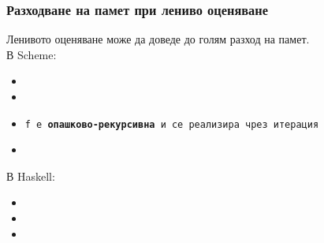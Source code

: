 \documentclass{beamer}
\begin{document}
\begin{frame}
  \frametitle{Разходване на памет при лениво оценяване}

  Ленивото оценяване може да доведе до голям разход на памет.\\[1em]\pause
  В Scheme:
  \lstset{language=Scheme}
  \begin{itemize}[<+->]
  \item {}
  \item {}
  \item \tt f е \textbf{опашково-рекурсивна} и се реализира чрез итерация
  \item {}
  \end{itemize}
  \onslide<+->
  В Haskell:
  \lstset{language=Haskell}
  \begin{itemize}[<+->]
  \item {}
  \item {}
  \item {}
  \end{itemize}
\end{frame}
\end{document}

